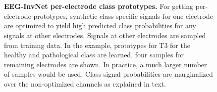 \begin{figure}[h!tb]
    \captionsetup[subfigure]{labelformat=empty}
    \myfloatalign
     \quad
     \\
     \quad
     \\
    \caption[EEG-InvNet per-electrode class prototypes]{
    \textbf{EEG-InvNet per-electrode class prototypes.} For getting
per-electrode prototypes, synthetic class-specific signals for one electrode are optimized to yield high predicted class probabilities for any signals at other electrodes.  Signals at other electrodes are sampled from training
data. In the example, prototypes for T3 for the healthy and pathological
class are learned, four samples for remaining electrodes are shown. In
practice, a much larger number of samples would be used. Class signal
probabilities are marginalized over the non-optimized channels as
explained in text.
    }\label{invnet-marginal-chan-explanation-fig}
\end{figure}


